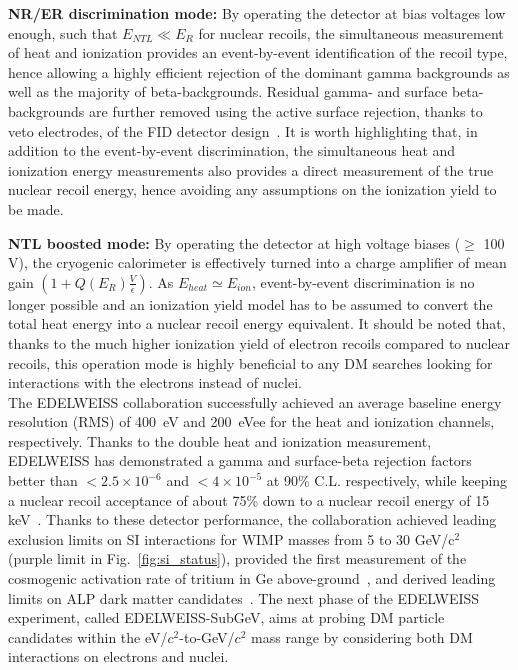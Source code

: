{\bf NR/ER discrimination mode:} By operating the detector at bias voltages low enough, such that $E_{NTL} \ll E_R$ for nuclear recoils, the simultaneous measurement of heat and ionization provides an event-by-event identification of the recoil type, hence allowing a highly efficient rejection of the dominant gamma backgrounds as well as the majority of beta-backgrounds. Residual gamma- and surface beta-backgrounds are further removed using the active surface rejection, thanks to veto electrodes, of the FID detector design~\cite{Armengaud:2017rzu}. It is worth highlighting  that, in addition to the event-by-event discrimination, the simultaneous heat and ionization energy measurements also provides a direct measurement of the true nuclear recoil energy, hence avoiding any assumptions on the ionization yield to be made. 

{\bf NTL boosted mode:} By operating the detector at high voltage biases ($\geq$ 100 V), the cryogenic calorimeter is effectively turned into a charge amplifier of mean gain $(1+Q(E_R)\frac{V}{\epsilon})$. As $E_{heat} \simeq E_{ion}$, event-by-event discrimination is no longer possible and an ionization yield model has to be assumed to convert the total heat energy into a nuclear recoil energy equivalent. It should be noted that, thanks to the much higher ionization yield of electron recoils compared to nuclear recoils, this operation mode is highly beneficial to any DM searches looking for interactions with the electrons instead of nuclei.  \\


The EDELWEISS collaboration successfully achieved an average baseline energy resolution (RMS) of 400~eV and 200~eVee for the heat and ionization channels, respectively. Thanks to the double heat and ionization measurement, EDELWEISS has demonstrated a gamma and surface-beta rejection factors better than $< 2.5 \times 10^{-6}$ and $< 4\times 10^{-5}$ at 90\% C.L. respectively, while keeping a nuclear recoil acceptance of about 75\% down to a nuclear recoil energy of 15 keV~\cite{Armengaud:2017rzu}. Thanks to these detector performance, the collaboration achieved leading exclusion limits on SI interactions for WIMP masses from 5 to 30 GeV/c$^2$~\cite{Hehn:2016nll} (purple limit in Fig.~\ref{fig:si_status}), provided the first measurement of the cosmogenic activation rate of tritium in Ge above-ground~\cite{Armengaud:2016aoz}, and derived leading limits on ALP dark matter candidates~\cite{Armengaud:2018cuy}. The next phase of the EDELWEISS experiment, called EDELWEISS-SubGeV, aims at probing DM particle candidates within the eV/$c^2$-to-GeV/$c^2$ mass range by considering both DM interactions on electrons and nuclei. 


